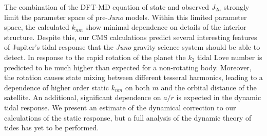 The combination of the DFT-MD equation of state and observed $J_{2n}$ strongly limit
the parameter space of pre-\textit{Juno} models. Within this limited parameter space,
the calculated $k_{nm}$ show minimal dependence on details of the interior structure.
Despite this, our CMS calculations predict several interesting features of Jupiter's
tidal response that the \textit{Juno} gravity science system should be able to
detect. In response to the rapid rotation of the planet the $k_2$ tidal Love number
is predicted to be much higher than expected for a non-rotating body. Moreover, the
rotation causes state mixing between different tesseral harmonics, leading to a
dependence of higher order static $k_{nm}$ on both $m$ and the orbital distance of the
satellite. An additional, significant dependence on $a/r$ is expected in the dynamic
tidal response. We present an estimate of the dynamical correction to our
calculations of the static response, but a full analysis of the dynamic theory of
tides has yet to be performed.


